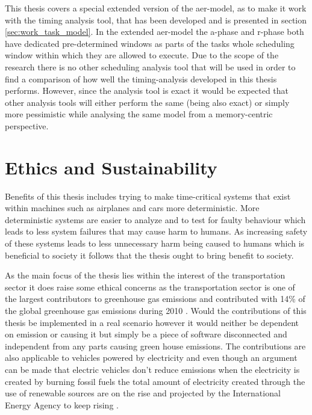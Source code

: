 \documentclass{kththesis}
\begin{document}
This thesis covers a special extended version of the \acrshort{aer}-model, as to make it work
with the timing analysis tool, that has been developed and is presented in section
\ref{sec:work_task_model}. In the extended \acrshort{aer}-model the \acrshort{a}-phase and \acrshort{r}-phase both have dedicated
pre-determined windows as parts of the tasks whole scheduling window within which they are allowed
to execute. Due to the scope of the research there is no other scheduling analysis tool that
will be used in order to find a comparison of how well the timing-analysis developed in this thesis
performs. However, since the analysis tool is exact it would be expected that other analysis tools
will either perform the same (being also exact) or simply more pessimistic while analysing the same
model from a memory-centric perspective.


\section{Ethics and Sustainability}
Benefits of this thesis includes trying to make time-critical systems that exist within machines such
as airplanes and cars more deterministic. More deterministic systems are easier to analyze and to test
for faulty behaviour which leads to less system failures that may cause harm to humans. As
increasing safety of these systems leads to less unnecessary harm being caused to humans which is
beneficial to society it follows that the thesis ought to bring benefit to society.

As the main focus of the thesis lies within the interest of the transportation sector it does raise
some ethical concerns as the transportation sector is one of the largest contributors to greenhouse
gas emissions and contributed with 14\% of the global greenhouse gas emissions during 2010
\parencite{us_epa_global_2016}. Would the contributions of this thesis be implemented in a real
scenario however it would neither be dependent on emission or causing it but simply be a piece of
software disconnected and independent from any parts causing green house emissions. The contributions
are also applicable to vehicles powered by electricity and even though an argument can be made that
electric vehicles don't reduce emissions when the electricity is created by burning fossil fuels
the total amount of electricity created through the use of renewable sources are on the rise and
projected by the International Energy Agency to keep rising \parencite{fatih_renewables_nodate}.
\end{document}
